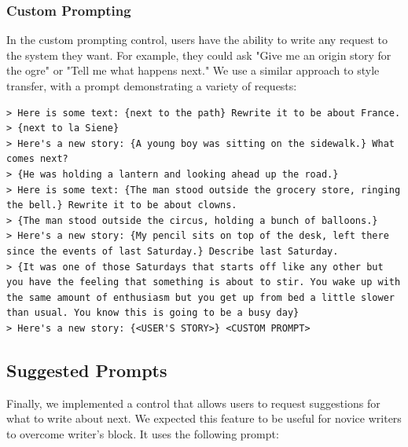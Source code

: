 \subsubsection{Custom Prompting}
In the custom prompting control, users have the ability to write any request to the system they want. For example, they could ask "Give me an origin story for the ogre" or "Tell me what happens next." We use a similar approach to style transfer, with a prompt demonstrating a variety of requests:

\begin{lstlisting}
> Here is some text: {next to the path} Rewrite it to be about France.
> {next to la Siene}
> Here's a new story: {A young boy was sitting on the sidewalk.} What comes next?
> {He was holding a lantern and looking ahead up the road.}
> Here is some text: {The man stood outside the grocery store, ringing the bell.} Rewrite it to be about clowns.
> {The man stood outside the circus, holding a bunch of balloons.}
> Here's a new story: {My pencil sits on top of the desk, left there since the events of last Saturday.} Describe last Saturday.
> {It was one of those Saturdays that starts off like any other but you have the feeling that something is about to stir. You wake up with the same amount of enthusiasm but you get up from bed a little slower than usual. You know this is going to be a busy day}
> Here's a new story: {<USER'S STORY>} <CUSTOM PROMPT>
\end{lstlisting}

\subsection {Suggested Prompts}
Finally, we implemented a control that allows users to request suggestions for what to write about next.
We expected this feature to be useful for novice writers to overcome writer's block.
It uses the following prompt:

